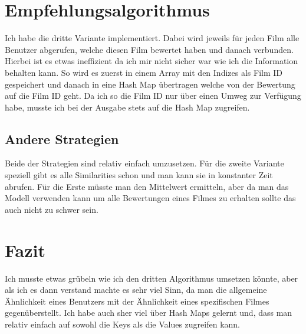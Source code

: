 \documentclass{article}
\begin{document}
	\section{Empfehlungsalgorithmus}
	Ich habe die dritte Variante implementiert. Dabei wird jeweils für jeden Film alle Benutzer abgerufen, welche diesen Film bewertet haben und danach verbunden. Hierbei ist es etwas ineffizient da ich mir nicht sicher war wie ich die Information behalten kann. So wird es zuerst in einem Array mit den Indizes als Film ID gespeichert und danach in eine Hash Map übertragen welche von der Bewertung auf die Film ID geht. Da ich so die Film ID nur über einen Umweg zur Verfügung habe, musste ich bei der Ausgabe stets auf die Hash Map zugreifen.
	\subsection{Andere Strategien}
	Beide der Strategien sind relativ einfach umzusetzen. Für die zweite Variante speziell gibt es alle Similarities schon und man kann sie in konstanter Zeit abrufen. Für die Erste müsste man den Mittelwert ermitteln, aber da man das Modell verwenden kann um alle Bewertungen eines Filmes zu erhalten sollte das auch nicht zu schwer sein.
	\section{Fazit}
	Ich musste etwas grübeln wie ich den dritten Algorithmus umsetzen könnte, aber als ich es dann verstand machte es sehr viel Sinn, da man die allgemeine Ähnlichkeit eines Benutzers mit der Ähnlichkeit eines spezifischen Filmes gegenüberstellt. Ich habe auch sher viel über Hash Maps gelernt und, dass man relativ einfach auf sowohl die Keys als die Values zugreifen kann.
	























  
\end{document}
